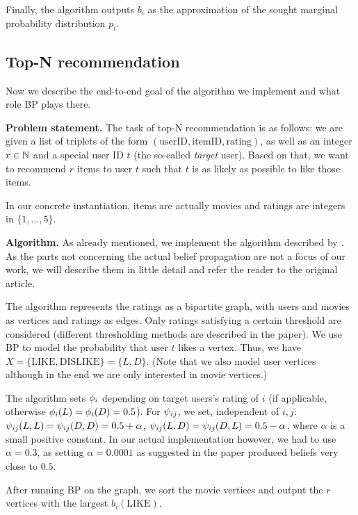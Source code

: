 \documentclass[letterpaper]{article}
\newcommand{\mypar}[1]{{\bf #1.}}
\begin{document}
Finally, the algorithm outputs $b_i$ as the approximation of the sought
marginal probability distribution $p_i$.

\subsection{Top-N recommendation} \label{subsec:topn}

Now we describe the end-to-end goal of the algorithm we implement and what role
BP plays there.

\mypar{Problem statement} The task of top-N recommendation is as follows: we
are given a list of triplets of the form $(\text{userID}, \text{itemID},
\text{rating})$, as well as an integer $r\in\mathbb{N}$ and a special user ID $t$ (the
so-called \emph{target} user). Based on that, we want to recommend $r$ items to
user $t$ such that $t$ is as likely as possible to like those items.

In our concrete instantiation, items are actually movies and ratings are
integers in $\{1, \ldots, 5\}$.

\mypar{Algorithm} As already mentioned, we implement the algorithm described by
\citet{top-n-recommendation}. As the parts not concerning the actual belief
propagation are not a focus of our work, we will describe them in little detail
and refer the reader to the original article.

The algorithm represents the ratings as a bipartite graph, with users and
movies as vertices and ratings as edges. Only ratings satisfying a certain
threshold are considered (different thresholding methods are described in the
paper). We use BP to model the probability that user $t$ likes a vertex. Thus,
we have $X = \{\text{LIKE}, \text{DISLIKE}\} = \{L, D\}$. (Note that we also
model user vertices although in the end we are only interested in movie
vertices.)

The algorithm sets $\phi_i$ depending on target users's rating of $i$ (if applicable, otherwise $\phi_i(L) = \phi_i(D) = 0.5$). For $\psi_{ij}$, we set, independent of $i, j$:
$\psi_{ij}(L, L) = \psi_{ij}(D, D) = 0.5 + \alpha$, $\psi_{ij}(L,
D) = \psi_{ij}(D, L) = 0.5 - \alpha$, where
$\alpha$ is a small positive constant. In our actual implementation however, we had to use $\alpha = 0.3$, as setting $\alpha = 0.0001$ as suggested in the paper produced beliefs very close to $0.5$.

After running BP on the graph, we sort the movie vertices and output the $r$
vertices with the largest $b_i(\text{LIKE})$.
\end{document}
